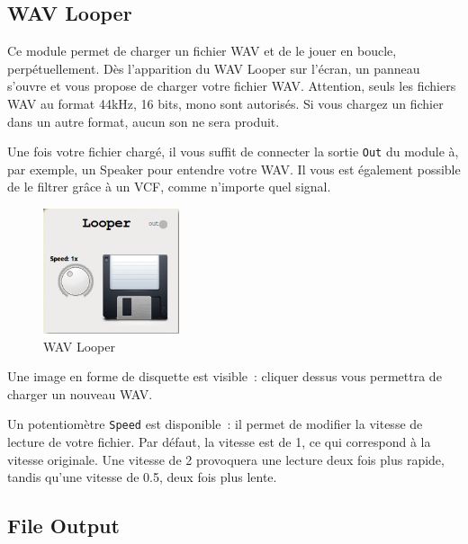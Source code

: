 \documentclass[a4paper,oneside,frenchb,10pt]{article}
\begin{document}
\subsection{WAV Looper}

\begin{multicols}{2}
Ce module permet de charger un fichier WAV et de le jouer en boucle,
perpétuellement. Dès l'apparition du WAV Looper sur l'écran, un panneau
s'ouvre et vous propose de charger votre fichier WAV. Attention, seuls
les fichiers WAV au format 44kHz, 16 bits, mono sont autorisés. Si vous
chargez un fichier dans un autre format, aucun son ne sera produit.

Une fois votre fichier chargé, il vous suffit de connecter la sortie
\verb!Out! du module à, par exemple, un Speaker pour entendre votre WAV.
Il vous est également possible de le filtrer grâce à un VCF, comme
n'importe quel signal.

\begin{figure}[H]
\centering
\includegraphics[width=4cm]{../img/png/wavlooper.png}
\caption{WAV Looper}
\end{figure}
\end{multicols}

Une image en forme de disquette est visible~: cliquer dessus vous
permettra de charger un nouveau WAV.

Un potentiomètre \verb!Speed! est disponible~: il permet de modifier la
vitesse de lecture de votre fichier. Par défaut, la vitesse est de 1, ce
qui correspond à la vitesse originale. Une vitesse de 2 provoquera une
lecture deux fois plus rapide, tandis qu'une vitesse de 0.5, deux fois
plus lente.

\subsection{File Output}
\end{document}
